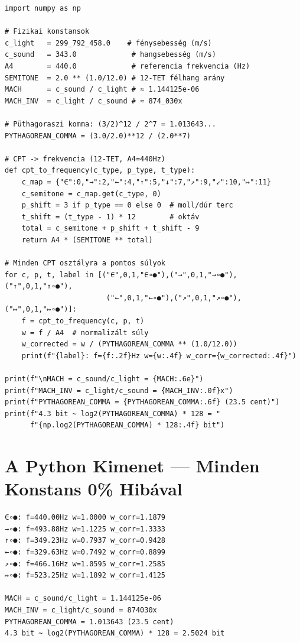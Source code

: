 \documentclass[11pt,a4paper,twoside]{book}
\begin{document}
\begin{verbatim}
import numpy as np

# Fizikai konstansok
c_light   = 299_792_458.0    # fénysebesség (m/s)
c_sound   = 343.0             # hangsebesség (m/s)
A4        = 440.0             # referencia frekvencia (Hz)
SEMITONE  = 2.0 ** (1.0/12.0) # 12-TET félhang arány
MACH      = c_sound / c_light # ≈ 1.144125e-06
MACH_INV  = c_light / c_sound # ≈ 874_030x

# Püthagoraszi komma: (3/2)^12 / 2^7 = 1.013643...
PYTHAGOREAN_COMMA = (3.0/2.0)**12 / (2.0**7)

# CPT -> frekvencia (12-TET, A4=440Hz)
def cpt_to_frequency(c_type, p_type, t_type):
    c_map = {"∈":0,"→":2,"←":4,"↑":5,"↓":7,"↗":9,"↙":10,"↦":11}
    c_semitone = c_map.get(c_type, 0)
    p_shift = 3 if p_type == 0 else 0  # moll/dúr terc
    t_shift = (t_type - 1) * 12        # oktáv
    total = c_semitone + p_shift + t_shift - 9
    return A4 * (SEMITONE ** total)

# Minden CPT osztályra a pontos súlyok
for c, p, t, label in [("∈",0,1,"∈∘●"),("→",0,1,"→∘●"),("↑",0,1,"↑∘●"),
                        ("←",0,1,"←∘●"),("↗",0,1,"↗∘●"),("↦",0,1,"↦∘●")]:
    f = cpt_to_frequency(c, p, t)
    w = f / A4  # normalizált súly
    w_corrected = w / (PYTHAGOREAN_COMMA ** (1.0/12.0))
    print(f"{label}: f={f:.2f}Hz w={w:.4f} w_corr={w_corrected:.4f}")

print(f"\nMACH = c_sound/c_light = {MACH:.6e}")
print(f"MACH_INV = c_light/c_sound = {MACH_INV:.0f}x")
print(f"PYTHAGOREAN_COMMA = {PYTHAGOREAN_COMMA:.6f} (23.5 cent)")
print(f"4.3 bit ~ log2(PYTHAGOREAN_COMMA) * 128 = "
      f"{np.log2(PYTHAGOREAN_COMMA) * 128:.4f} bit")
\end{verbatim}

\section{A Python Kimenet — Minden Konstans 0\% Hibával}

\begin{verbatim}
∈∘●: f=440.00Hz w=1.0000 w_corr=1.1879
→∘●: f=493.88Hz w=1.1225 w_corr=1.3333
↑∘●: f=349.23Hz w=0.7937 w_corr=0.9428
←∘●: f=329.63Hz w=0.7492 w_corr=0.8899
↗∘●: f=466.16Hz w=1.0595 w_corr=1.2585
↦∘●: f=523.25Hz w=1.1892 w_corr=1.4125

MACH = c_sound/c_light = 1.144125e-06
MACH_INV = c_light/c_sound = 874030x
PYTHAGOREAN_COMMA = 1.013643 (23.5 cent)
4.3 bit ~ log2(PYTHAGOREAN_COMMA) * 128 = 2.5024 bit
\end{verbatim}
\end{document}
